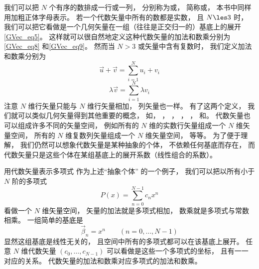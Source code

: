 

我们可以把 $N$ 个有序的数排成一行或一列， 分别称为或， 简称或， 本书中同样用加粗正体字母表示。 若一个代数矢量中所有的数都是实数， 且 $N \les 3$%
时， 我们可以把它看做是一个几何矢量在一组（往往是正交归一的）基底上的展开\autoref{GVec_eq5}。 这样就可以很自然地定义这种代数矢量的加法和数乘分别为\autoref{GVec_eq8} 和\autoref{GVec_eq9}。 然而当 $N > 3$ 或矢量中含有复数时， 我们定义加法和数乘分别为
\begin{equation}
\vec u + \vec v = \sum_{i = 1}^N u_i + v_i
\end{equation}
\begin{equation}
\lambda \vec v = \sum_{i = 1}^N \lambda v_i
\end{equation}
注意 $N$ 维行矢量只能与 $N$ 维行矢量相加， 列矢量也一样。 有了这两个定义， 我们就可以类似几何矢量得到其他重要的概念， 如， ， ， ， ， 和。 代数矢量也可以组成许多不同的矢量空间， 例如所有的 $N$ 维的实数行矢量组成一个 $N$ 维矢量空间， 所有的 $N$ 维复数列矢量组成一个 $N$ 维矢量空间， 等等。 为了便于理解， 我们仍然可以想象代数矢量是某种抽象的个体， 不依赖任何基底而存在， 而代数矢量只是这些个体在某组基底上的展开系数（线性组合的系数）。

\begin{exam}{用代数矢量表示多项式}
作为上述“抽象个体” 的一个例子， 我们可以把以所有小于 $N$ 阶的多项式
\begin{equation}
P(x) = \sum_{n = 0}^{N-1} c_n x^n
\end{equation}
看做一个 $N$ 维矢量空间， 矢量的加法就是多项式相加， 数乘就是多项式与常数相乘。 一组简单的基底是
\begin{equation}
\vec \beta_n = x^n \qquad (n = 0, \dots, N-1)
\end{equation}
显然这组基底是线性无关的， 且空间中所有的多项式都可以在该基底上展开。 任意 $N$ 维代数矢量 $(c_0, \dots, c_{N-1})$ 可以看做是这些一个多项式的坐标， 且有一一对应的关系。 代数矢量的加法和数乘对应多项式的加法和数乘。
\end{exam}

